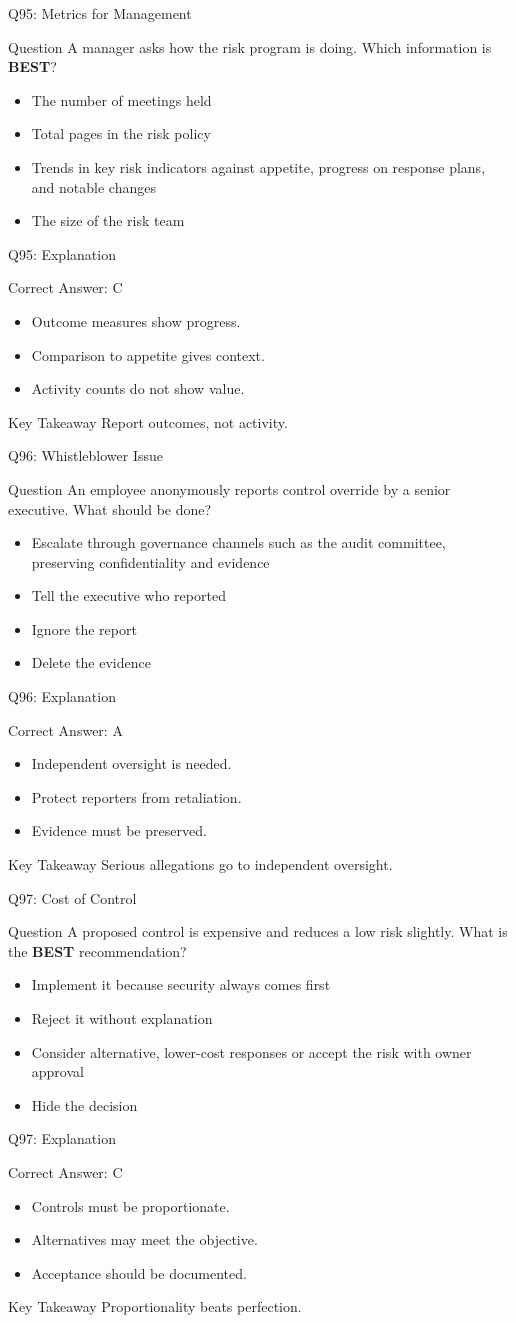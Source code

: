 \documentclass[aspectratio=169]{beamer}
\newcommand{\hq}[7]{%
	\begin{frame}{Q#1: #2}
		\begin{block}{Question}
			#3
		\end{block}
		\begin{itemize}
			#4
		\end{itemize}
	\end{frame}
	\begin{frame}{Q#1: Explanation}
		\begin{block}{Correct Answer: #5}
			\begin{itemize}
				#6
			\end{itemize}
		\end{block}
		\begin{alertblock}{Key Takeaway}
			#7
		\end{alertblock}
	\end{frame}
}
\begin{document}
	\hq{95}{Metrics for Management}
	{A manager asks how the risk program is doing. Which information is \textbf{BEST}?}
	{\item[\textbf{(A)}] The number of meetings held
		\item[\textbf{(B)}] Total pages in the risk policy
		\item[\textbf{(C)}] Trends in key risk indicators against appetite, progress on response plans, and notable changes
		\item[\textbf{(D)}] The size of the risk team}
	{C}
	{\item Outcome measures show progress.
		\item Comparison to appetite gives context.
		\item Activity counts do not show value.}
	{Report outcomes, not activity.}
	
	\hq{96}{Whistleblower Issue}
	{An employee anonymously reports control override by a senior executive. What should be done?}
	{\item[\textbf{(A)}] Escalate through governance channels such as the audit committee, preserving confidentiality and evidence
		\item[\textbf{(B)}] Tell the executive who reported
		\item[\textbf{(C)}] Ignore the report
		\item[\textbf{(D)}] Delete the evidence}
	{A}
	{\item Independent oversight is needed.
		\item Protect reporters from retaliation.
		\item Evidence must be preserved.}
	{Serious allegations go to independent oversight.}
	
	\hq{97}{Cost of Control}
	{A proposed control is expensive and reduces a low risk slightly. What is the \textbf{BEST} recommendation?}
	{\item[\textbf{(A)}] Implement it because security always comes first
		\item[\textbf{(B)}] Reject it without explanation
		\item[\textbf{(C)}] Consider alternative, lower-cost responses or accept the risk with owner approval
		\item[\textbf{(D)}] Hide the decision}
	{C}
	{\item Controls must be proportionate.
		\item Alternatives may meet the objective.
		\item Acceptance should be documented.}
	{Proportionality beats perfection.}
	
\end{document}
